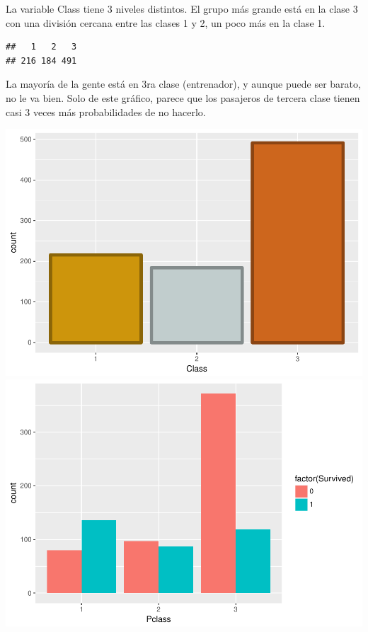 \documentclass[]{article}
\newenvironment{Shaded}{\begin{snugshade}}{\end{snugshade}}
\newcommand{\KeywordTok}[1]{\textcolor[rgb]{0.13,0.29,0.53}{\textbf{#1}}}
\newcommand{\StringTok}[1]{\textcolor[rgb]{0.31,0.60,0.02}{#1}}
\newcommand{\OperatorTok}[1]{\textcolor[rgb]{0.81,0.36,0.00}{\textbf{#1}}}
\newcommand{\NormalTok}[1]{#1}
\begin{document}
La variable Class tiene 3 niveles distintos. El grupo más grande está en
la clase 3 con una división cercana entre las clases 1 y 2, un poco más
en la clase 1.

\begin{Shaded}
\end{Shaded}

\begin{verbatim}
##   1   2   3 
## 216 184 491
\end{verbatim}

La mayoría de la gente está en 3ra clase (entrenador), y aunque puede
ser barato, no le va bien. Solo de este gráfico, parece que los
pasajeros de tercera clase tienen casi 3 veces más probabilidades de no
hacerlo.

\includegraphics{titanicDataClean_files/figure-latex/set_library_plot2-1.pdf}
\includegraphics{titanicDataClean_files/figure-latex/set_library_plot2-2.pdf}
\end{document}

